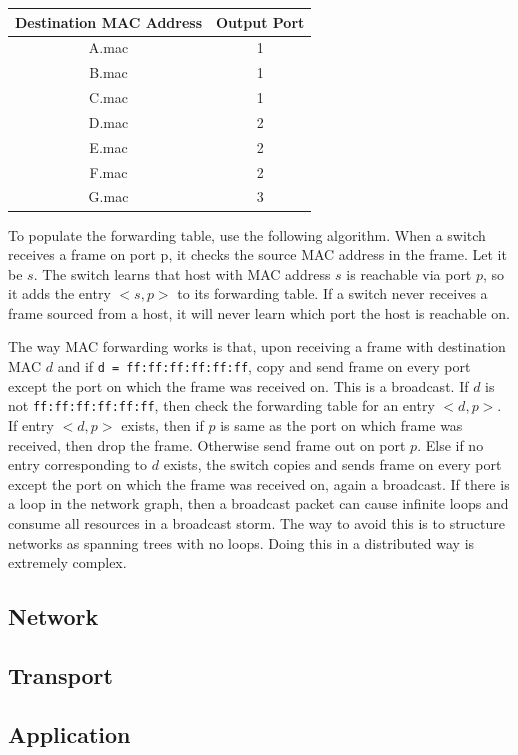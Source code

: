 \begin{table}[h]
    \centering
    \begin{tabular}{|c|c|}
        \hline
        \textbf{Destination MAC Address} & \textbf{Output Port} \\ \hline
        A.mac                            & 1                    \\ \hline
        B.mac                            & 1                    \\ \hline
        C.mac                            & 1                    \\ \hline
        D.mac                            & 2                    \\ \hline
        E.mac                            & 2                    \\ \hline
        F.mac                            & 2                    \\ \hline
        G.mac                            & 3                    \\ \hline
    \end{tabular}
\end{table}

To populate the forwarding table, use the following algorithm.
When a switch receives a frame on port p, it checks the source
MAC address in the frame. Let it be $s$.
The switch learns that host with MAC address $s$ is reachable via port $p$,
so it adds the entry $<s, p>$ to its forwarding table.
If a switch never receives a frame sourced from a host, it
will never learn which port the host is reachable on.

The way MAC forwarding works is that, upon receiving a frame with destination
MAC $d$ and if \texttt{d = ff:ff:ff:ff:ff:ff}, copy and send frame on every
port except the port on which the frame was received on. This is a broadcast.
If $d$ is not \texttt{ff:ff:ff:ff:ff:ff}, then check the forwarding table
for an entry $<d, p>$. If entry $<d, p>$ exists, then if $p$ is same as the
port on which frame was received, then drop the frame. Otherwise send frame
out on port $p$. Else if no entry corresponding to $d$ exists, the switch
copies and sends frame on every port except the port on
which the frame was received on, again a broadcast. If there is a loop
in the network graph, then a broadcast packet can cause infinite loops
and consume all resources in a broadcast storm. The way to avoid this
is to structure networks as spanning trees with no loops. Doing this
in a distributed way is extremely complex.

\subsection{Network}

\subsection{Transport}

\subsection{Application}


